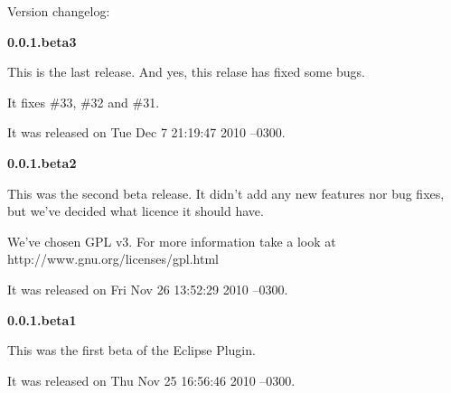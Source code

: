 Version changelog:

\textbf{0.0.1.beta3}

This is the last release. And yes, this relase has fixed some bugs.

It fixes \#33, \#32 and \#31.

It was released on Tue Dec 7 21:19:47 2010 --0300.

\textbf{0.0.1.beta2}

This was the second beta release. It didn't add any new features nor bug fixes, but we've decided what
licence it should have.

We've chosen GPL v3. For more information take a look at http://www.gnu.org/licenses/gpl.html

It was released on Fri Nov 26 13:52:29 2010 --0300.

\textbf{0.0.1.beta1}

This was the first beta of the Eclipse Plugin. 

It was released on Thu Nov 25 16:56:46 2010 --0300.

